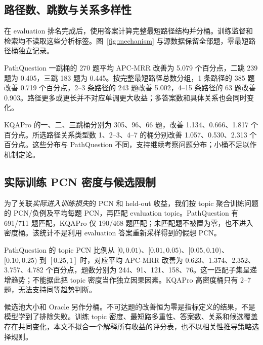 \documentclass[UTF8,a4paper,10pt,fontset=fandol]{ctexart}
\begin{document}
\subsection{路径数、跳数与关系多样性}
在 evaluation 排名完成后，使用答案计算完整最短路径结构并分桶。训练监督和检索均不读取这些分析标签。图~\ref{fig:mechanism} 与源数据保留全部题，零最短路径桶独立记录。

PathQuestion 一跳桶的 270 题平均 APC-MRR 改善为 5.079 个百分点，二跳 239 题为 0.405，三跳 183 题为 0.445。按完整最短路径总数分组，1 条路径的 385 题改善 0.719 个百分点，2--3 条路径的 243 题改善 5.002，4--15 条路径的 63 题改善 0.903。路径更多或更长并不对应单调更大收益；多答案数和具体关系也会同时变化。

KQAPro 的一、二、三跳桶分别为 305、96、66 题，改善 1.134、0.666、1.817 个百分点。所选路径关系类型数 1、2--3、4--7 的桶分别改善 1.057、0.530、2.313 个百分点。这些分布与 PathQuestion 不同，支持继续考察问题分布；小桶不足以作机制定论。

\subsection{实际训练 PCN 密度与候选限制}
为了关联\emph{实际进入训练损失}的 PCN 和 held-out 收益，我们按 topic 聚合训练问题的 PCN/负例及平均每题 PCN，再匹配 evaluation topic。PathQuestion 有 691/711 题匹配，KQAPro 仅 190/468 题匹配；未匹配题不被置为零，也不进入密度桶。该统计不是利用 evaluation 答案重新采样得到的假想 PCN。

PathQuestion 的 topic PCN 比例从 $[0,0.01)$、$[0.01,0.05)$、$[0.05,0.10)$、$[0.10,0.25)$ 到 $[0.25,1]$ 时，对应平均 APC-MRR 改善为 0.623、1.374、2.352、3.757、4.782 个百分点，题数分别为 244、91、121、158、76。这一匹配子集呈递增趋势；不能据此把 topic 密度当作独立因果因素。KQAPro 高密度桶只有 2--7 题，无法支持同等趋势判断。

候选池大小和 Oracle 另作分桶。不可达题的改善恒为零是指标定义的结果，不是模型学到了排除失败。训练 topic 密度、最短路多重性、答案数、关系和候选覆盖存在共同变化，本文不拟合一个解释所有收益的评分表，也不以相关性推导策略选择规则。
\end{document}
